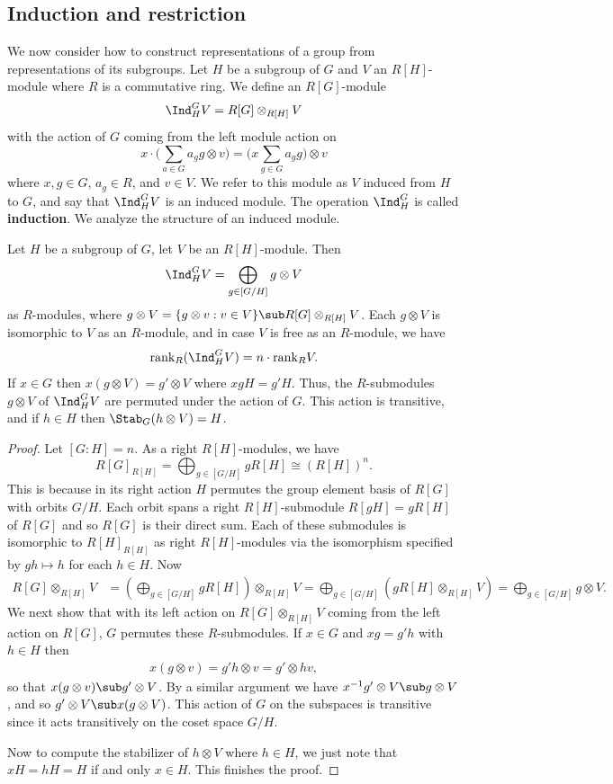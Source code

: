 \subsection{Induction and restriction}
We now consider how to construct representations of a group from representations of its subgroups. Let $H$ be a subgroup of $G$ and $V$ an $R[H]$-module where $R$ is a commutative ring. We define an $R[G]$-module
\[\Ind^G_HV=R[G]\otimes_{R[H]}V\]
with the action of $G$ coming from the left module action on
\[x\cdot\Big(\sum_{a\in G}a_gg\otimes v\Big)=\Big(x\sum_{g\in G}a_gg\Big)\otimes v\]
where $x,g\in G$, $a_g\in R$, and $v\in V$. We refer to this module as $V$ induced from $H$ to $G$, and say that $\Ind^G_HV$ is an induced module. The operation $\Ind^G_H$ is called \textbf{induction}. We analyze the structure of an induced module.
\begin{proposition}\label{representation induction decomposition}
Let $H$ be a subgroup of $G$, let $V$ be an $R[H]$-module. Then
\[\Ind^G_HV=\bigoplus_{g\in[G/H]}g\otimes V\]
as $R$-modules, where $g\otimes V=\{g\otimes v:v\in V\}\sub R[G]\otimes_{R[H]}V$. Each $g\otimes V$ is isomorphic to $V$ as an $R$-module, and in case $V$ is free as an $R$-module, we have
\[\mathrm{rank}_R(\Ind^G_HV)=n\cdot\mathrm{rank}_RV.\]
If $x\in G$ then $x(g\otimes V)=g'\otimes V$ where $xgH=g'H$. Thus, the $R$-submodules $g\otimes V$ of $\Ind^G_HV$ are permuted under the action of $G$. This action is transitive, and if $h\in H$ then $\Stab_G(h\otimes V)=H$.
\end{proposition}
\begin{proof}
Let $[G:H]=n$. As a right $R[H]$-modules, we have
\[R[G]_{R[H]}=\bigoplus_{g\in[G/H]}gR[H]\cong(R[H])^n.\]
This is because in its right action $H$ permutes the group element basis of $R[G]$ with orbits $G/H$. Each orbit spans a right $R[H]$-submodule $R[gH]=gR[H]$ of $R[G]$ and so $R[G]$ is their direct sum. Each of these submodules is isomorphic to $R[H]_{R[H]}$ as right $R[H]$-modules via the isomorphism specified by $gh\mapsto h$ for each
$h\in H$. Now
\begin{align*}
R[G]\otimes_{R[H]}V&=(\bigoplus_{g\in[G/H]}gR[H])\otimes_{R[H]}V=\bigoplus_{g\in[G/H]}(gR[H]\otimes_{R[H]}V)=\bigoplus_{g\in[G/H]}g\otimes V.
\end{align*}
We next show that with its left action on $R[G]\otimes_{R[H]}V$ coming from the left action on $R[G]$, $G$ permutes these $R$-submodules. If $x\in G$ and $xg=g'h$ with $h\in H$ then
\begin{align*}
x(g\otimes v)=g'h\otimes v=g'\otimes hv,
\end{align*}
so that $x(g\otimes v)\sub g'\otimes V$. By a similar argument we have $x^{-1}g'\otimes V\sub g\otimes V$, and so $g'\otimes V\sub x(g\otimes V)$. This action of $G$ on the subspaces is transitive since it acts transitively on the coset space $G/H$.\par
Now to compute the stabilizer of $h\otimes V$ where $h\in H$, we just note that $xH=hH=H$ if and only $x\in H$. This finishes the proof.
\end{proof}
